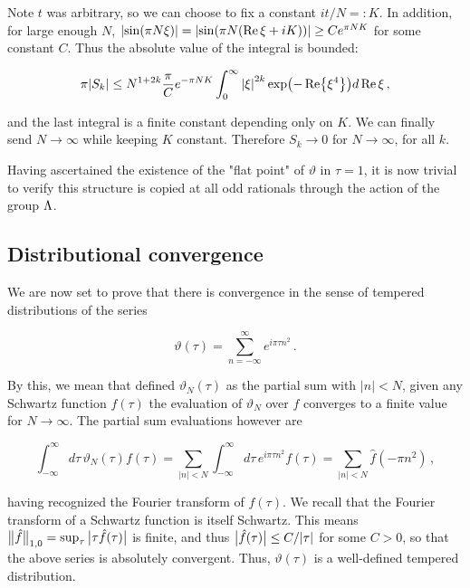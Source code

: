 \documentclass{article}
\newcommand{\T}{\ensuremath{\vartheta}}
\newcommand{\intR}{\int_{-\infty}^\infty}
\newcommand{\sumZ}{\sum_{n=-\infty}^{\infty}}
\begin{document}
Note $t$ was arbitrary, so we can choose to fix a constant $it/N =: K$. In addition, for large enough $N$, $\abs{\sin(\pi N \xi)} = \abs{\sin(\pi N (\Re \xi + iK))} \geq C e^{\pi N K}$ for some constant $C$. Thus the absolute value of the integral is bounded:

\begin{equation}
    \pi \abs{S_k} \leq N^{1+2k} \frac{\pi}{C} e^{-\pi N K} \int_0^{\infty} \abs{\xi}^{2k} \exp(-\Re{\xi^{4}}) d\Re\xi\,,
\end{equation}

and the last integral is a finite constant depending only on $K$. We can finally send $N\rightarrow \infty$ while keeping $K$ constant. Therefore $S_k \rightarrow 0$ for $N\rightarrow \infty$, for all $k$.

Having ascertained the existence of the "flat point" of $\vartheta$ in $\tau = 1$, it is now trivial to verify this structure is copied at all odd rationals through the action of the group $\Lambda$.

\subsection{Distributional convergence}\label{sec:convergence}

We are now set to prove that there is convergence in the sense of tempered distributions of the series

\begin{equation}
    \vartheta(\tau) = \sumZ e^{i\pi \tau n^2}\,.
\end{equation}

By this, we mean that defined $\vartheta_N(\tau)$ as the partial sum with $|n| < N$, given any Schwartz function $f(\tau)$ the evaluation of $\vartheta_N$ over $f$ converges to a finite value for $N\rightarrow\infty$. The partial sum evaluations however are

\begin{equation}
    \intR d\tau \, \vartheta_N(\tau) f(\tau) = \sum_{|n|<N} \intR d\tau\, e^{i\pi\tau n^2} f(\tau) = \sum_{|n|<N} \hat f(-\pi n^2)\,,
\end{equation}

having recognized the Fourier transform of $f(\tau)$. We recall that the Fourier transform of a Schwartz function is itself Schwartz. This means $\norm\big{\hat f}_{1,0} = \sup_\tau \abs\big{\tau \hat f(\tau)}$ is finite, and thus $\abs\big{\hat f(\tau)} \leq C/\abs{\tau}$ for some $C>0$, so that the above series is absolutely convergent. Thus, $\T(\tau)$ is a well-defined tempered distribution.
\end{document}
